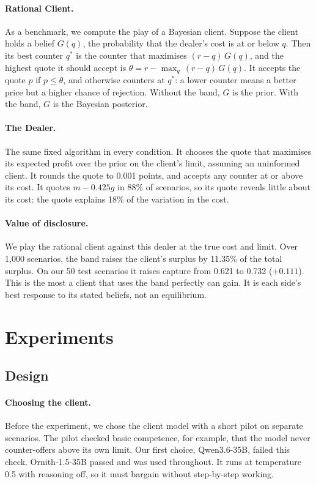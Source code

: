 \documentclass[sigconf]{acmart}
\begin{document}
\paragraph{Rational Client.}
As a benchmark, we compute the play of a Bayesian client. Suppose the client holds a belief $G(q)$, the probability that the dealer's cost is at or below $q$. Then its best counter $q^*$ is the counter that maximises $(r - q)\,G(q)$, and the highest quote it should accept is $\theta = r - \max_q\,(r - q)\,G(q)$. It accepts the quote $p$ if $p \le \theta$, and otherwise counters at $q^*$: a lower counter means a better price but a higher chance of rejection. Without the band, $G$ is the prior. With the band, $G$ is the Bayesian posterior.

\paragraph{The Dealer.}
The same fixed algorithm in every condition. It chooses the quote that maximises its expected profit over the prior on the client's limit, assuming an uninformed client. It rounds the quote to 0.001 points, and accepts any counter at or above its cost. It quotes $m - 0.425g$ in 88\% of scenarios, so its quote reveals little about its cost: the quote explains 18\% of the variation in the cost.

\paragraph{Value of disclosure.}
We play the rational client against this dealer at the true cost and limit. Over 1{,}000 scenarios, the band raises the client's surplus by 11.35\% of the total surplus. On our 50 test scenarios it raises capture from 0.621 to 0.732 ($+0.111$). This is the most a client that uses the band perfectly can gain. It is each side's best response to its stated beliefs, not an equilibrium.

\section{Experiments}

\subsection{Design}

\paragraph{Choosing the client.}
Before the experiment, we chose the client model with a short pilot on separate scenarios. The pilot checked basic competence, for example, that the model never counter-offers above its own limit. Our first choice, Qwen3.6-35B, failed this check. Ornith-1.5-35B passed and was used throughout. It runs at temperature 0.5 with reasoning off, so it must bargain without step-by-step working.
\end{document}
